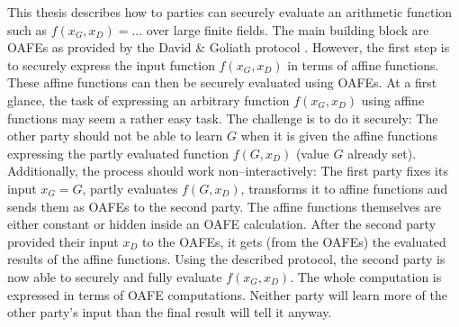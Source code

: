 \label{sec:introduction}

This thesis describes how to parties can securely evaluate an arithmetic
function such as $f(x_G,x_D) = ...$ over large finite fields. The main building
block are OAFEs as provided by the David \& Goliath protocol
\cite{davidgoliath}. However, the first step is to securely express the input
function $f(x_G, x_D)$ in terms of affine functions. These affine functions can
then be securely evaluated using OAFEs. At a first glance, the task of
expressing an arbitrary function $f(x_G, x_D)$ using affine functions may seem a
rather easy task. The challenge is to do it securely: The other party should not
be able to learn $G$ when it is given the affine functions expressing the partly
evaluated function $f(G, x_D)$ (value $G$ already set).  Additionally, the
process should work non--interactively: The first party fixes its input $x_G =
G$, partly evaluates $f(G, x_D)$, transforms it to affine functions and sends
them as OAFEs to the second party. The affine functions themselves are either
constant or hidden inside an OAFE calculation. After the second party provided
their input $x_D$ to the OAFEs, it gets (from the OAFEs) the evaluated results
of the affine functions. Using the described protocol, the second party is now
able to securely and fully evaluate $f(x_G, x_D)$. The whole computation is
expressed in terms of OAFE computations. Neither party will learn more of the
other party's input than the final result will tell it anyway.


\label{sec:related-work}

